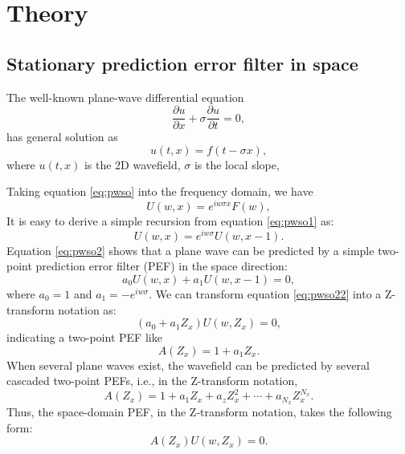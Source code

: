 \section{Theory}
\subsection{Stationary prediction error filter in space}
The well-known plane-wave differential equation
\begin{equation}
\label{eq:pw}
\frac{\partial u}{\partial x} + \sigma \frac{\partial u}{\partial t} = 0,
\end{equation}
has  general solution as 
\begin{equation}
\label{eq:pwso}
u(t,x) = f(t-\sigma x),
\end{equation}
where $u(t,x)$ is the 2D wavefield, $\sigma$ is the local slope,  

Taking equation \ref{eq:pwso} into the frequency domain, we have
\begin{equation}
\label{eq:pwso1}
U(w,x) = e^{iw\sigma x}F(w),
\end{equation}
 It is easy to derive a simple recursion from equation \ref{eq:pwso1} as:
\begin{equation}
\label{eq:pwso2}
U(w,x) = e^{iw\sigma} U(w,x-1).
\end{equation}
Equation \ref{eq:pwso2} shows that a plane wave can be predicted by a simple two-point prediction error filter (PEF) in the space direction:
\begin{equation}
\label{eq:pwso22}
a_0 U(w,x) + a_1 U(w,x-1) =0,
\end{equation}
where $a_0=1$ and $a_1=-e^{iw\sigma}$. We can transform equation \ref{eq:pwso22} into a Z-transform notation as:
\begin{equation}
\label{eq:pwso2z}
(a_0+a_1Z_x) U(w,Z_x) =0,
\end{equation}
indicating a two-point PEF like
\begin{equation}
\label{eq:twop}
A(Z_x) = 1 + a_1Z_x.
\end{equation}
When several plane waves exist, the wavefield can be predicted by several cascaded two-point PEFs, i.e., in the Z-transform notation,
\begin{equation}
\label{eq:twop}
A(Z_x) = 1 + a_1Z_x + a_z Z_x^2 + \cdots +a_{N_x}Z_x^{N_x}.
\end{equation}
Thus, the space-domain PEF, in the Z-transform notation, takes the following form:
\begin{equation}
\label{eq:pefx}
A(Z_x) U(w,Z_x) = 0.
\end{equation}

